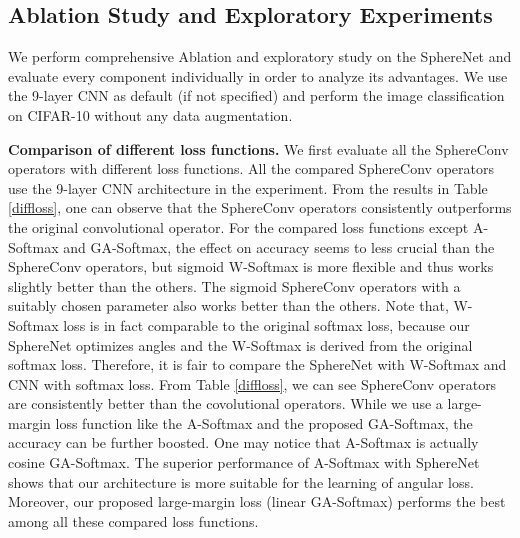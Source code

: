 \subsection{Ablation Study and Exploratory Experiments}\label{ablation}

We perform comprehensive Ablation and exploratory study on the SphereNet and evaluate every component individually in order to analyze its advantages. We use the 9-layer CNN as default (if not specified) and perform the image classification on CIFAR-10 without any data augmentation.

\par
\textbf{Comparison of different loss functions.} We first evaluate all the SphereConv operators with different loss functions. All the compared SphereConv operators use the 9-layer CNN architecture in the experiment. From the results in Table \ref{diffloss}, one can observe that the SphereConv operators consistently outperforms the original convolutional operator. For the compared loss functions except A-Softmax and GA-Softmax, the effect on accuracy seems to less crucial than the SphereConv operators, but sigmoid W-Softmax is more flexible and thus works slightly better than the others. The sigmoid SphereConv operators  with a suitably chosen parameter also works better than the others. Note that, W-Softmax loss is in fact comparable to the original softmax loss, because our SphereNet optimizes angles and the W-Softmax is derived from the original softmax loss. Therefore, it is fair to compare the SphereNet with W-Softmax and CNN with softmax loss. From Table \ref{diffloss}, we can see SphereConv operators are consistently better than the covolutional operators.  While we use a large-margin loss function like the A-Softmax \cite{liu2017sphereface} and the proposed GA-Softmax, the accuracy can be further boosted. One may notice that A-Softmax is actually cosine GA-Softmax.  The superior performance of A-Softmax with SphereNet shows that our architecture is more suitable for the learning of angular loss. Moreover, our proposed large-margin loss (linear GA-Softmax) performs the best among all these compared loss functions.
\par

